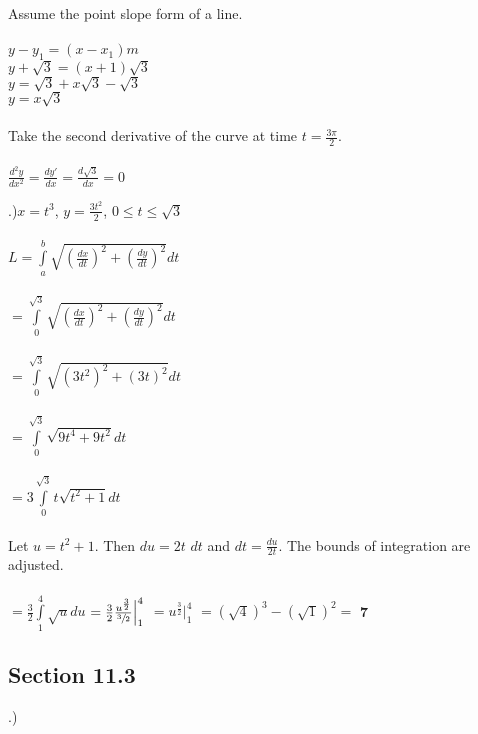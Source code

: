 \documentclass[12pt]{article}
\begin{document}
\noindent Assume the point slope form of a line.\\\\
$y-y_{1} = (x-x_{1})m$\\
$y+\sqrt{3} = (x+1)\sqrt{3}$\\
$y=\sqrt{3} + x\sqrt{3} -\sqrt{3}$\\
$y=  x\sqrt{3} $\\\\

\noindent Take the second derivative of the curve at time $t=\frac{3\pi}{2}$.\\\\
$\frac{d^{2}y}{dx^{2}} = \frac{dy'}{dx} = \frac{d\sqrt{3}}{dx} = 0$\pagebreak


.)$x=t^{3}$, \hspace{10pt} $y=\frac{3t^{2}}{2}$, \hspace{10pt} $0 \leq t \leq \sqrt{3}$\\\\
$L=\int\limits_{a}^{b}\sqrt{(\frac{dx}{dt})^{2} + (\frac{dy}{dt})^{2}}dt$\\\\
$=\int\limits_{0}^{\sqrt{3}}\sqrt{(\frac{dx}{dt})^{2} + (\frac{dy}{dt})^{2}}dt$\\\\
$=\int\limits_{0}^{\sqrt{3}}\sqrt{(3t^{2})^{2} + (3t)^{2}}dt$\\\\
$=\int\limits_{0}^{\sqrt{3}}\sqrt{9t^{4} + 9t^{2}}dt$\\\\
$=3\int\limits_{0}^{\sqrt{3}}t\sqrt{t^{2} + 1}dt$\\\\
Let $u=t^{2}+1$. Then $du = 2t$ $dt$ and $dt = \frac{du}{2t}$. The bounds of integration are adjusted. \\\\
$=\frac{3}{2}\int\limits_{1}^{4}\sqrt{u}du$
$=\frac{3}{2}\frac{u^{\frac{3}{2}}}{\sfrac{3}{2}}\Big|_1^4$
$=u^{\frac{3}{2}}\Big|_1^4$
$=(\sqrt{4})^{3} - (\sqrt{1})^{2} =$ \textbf{7}\\\pagebreak

\subsection*{Section 11.3}
.)




\end{document}
